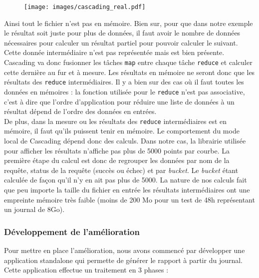 \begin{figure}[H]
	\centering
	\texttt{[image: images/cascading\_real.pdf]}
\end{figure}

Ainsi tout le fichier n'est pas en mémoire. Bien sur, pour que dans notre exemple le résultat soit juste pour plus de données, il faut avoir le nombre de données nécessaires pour calculer un résultat partiel pour pouvoir calculer le suivant. Cette donnée intermédiaire n'est pas représentée mais est bien présente.\\

Cascading va donc fusionner les tâches \verb+map+ entre chaque tâche \verb+reduce+ et calculer cette dernière au fur et à mesure. Les résultats en mémoire ne seront donc que les résultats des \verb+reduce+ intermédiaires. Il y a bien sur des cas où il faut toutes les données en mémoires : la fonction utilisée pour le \verb+reduce+ n'est pas associative, c'est à dire que l'ordre d'application pour réduire une liste de données à un résultat dépend de l'ordre des données en entrées.\\

De plus, dans la mesure ou les résultats des \verb+reduce+ intermédiaires est en mémoire, il faut qu'ils puissent tenir en mémoire. Le comportement du mode local de Cascading dépend donc des calculs. Dans notre cas, la librairie utilisée pour afficher les résultats n'affiche pas plus de 5000 points par courbe. La première étape du calcul est donc de regrouper les données par nom de la requête, status de la requête (succès ou échec) et par \textit{bucket}. Le \textit{bucket} étant calculée de façon qu'il n'y en ait pas plus de 5000. La nature de nos calculs fait que peu importe la taille du fichier en entrée les résultats intermédiaires ont une empreinte mémoire très faible (moins de 200 Mo pour un test de 48h représentant un journal de 8Go).\\

\subsubsection{Développement de l'amélioration}

Pour mettre en place l'amélioration, nous avons commencé par développer une application standalone qui permette de générer le rapport à partir du journal. Cette application effectue un traitement en 3 phases :

